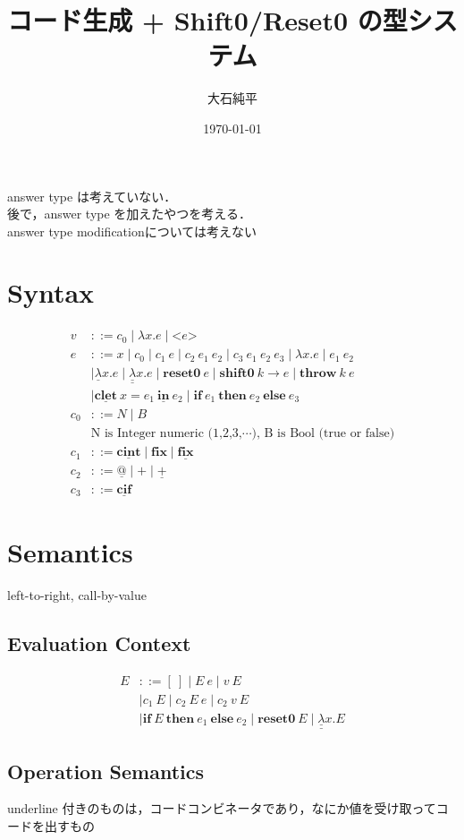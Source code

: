 \documentclass[10pt,a4j]{jarticle}
\title{コード生成 + Shift0/Reset0 の型システム}
\date{\today}
\author{大石純平}
\makeatletter
\newcommand\fun[2]{\lambda{#1}.{#2}}
\newcommand\Resetz{\textbf{reset0}}
\newcommand\Shiftz{\textbf{shift0}}
\newcommand\Throw{\textbf{throw}}
\newcommand\resetz[1]{\Resetz~{#1}}
\newcommand\shiftz[2]{\Shiftz~{#1}\to{#2}}
\newcommand\throw[2]{\Throw~{#1}~{#2}}
\newcommand\cfun[2]{\underline{\lambda}{#1}.{#2}}
\newcommand\ccfun[2]{\underline{\underline{\lambda}}{#1}.{#2}}
\newcommand\cPlus{\underline{\textbf{+}}}
\newcommand\cLet{\underline{\textbf{clet}}}
\newcommand\cIn{\underline{\textbf{in}}}
\newcommand\clet[3]{\cLet~{#1}={#2}~\cIn~{#3}}
\newcommand\cint{\underline{\textbf{cint}}}
\newcommand\code[1]{\texttt{<}{#1}\texttt{>}}
\newcommand\ift[3]{\textbf{if}~{#1}~\textbf{then}~{#2}~\textbf{else}~{#3}}
\newcommand\cIf{\underline{\textbf{cif}}}
\newcommand\fix{\textbf{fix}}
\newcommand\cfix{\underline{\textbf{fix}}}
\newcommand\cat{\underline{@}}
\theoremstyle{break}
\makeatother
\begin{document}
\maketitle

answer type は考えていない．\\
後で，answer type を加えたやつを考える．\\
answer type modificationについては考えない

\section{Syntax}
\begin{align*}
  v & ::= c_0 \mid \fun{x}{e} \mid \code{e} \\
  e & ::=  x \mid c_0 \mid c_1~ e \mid c_2~ e_1~ e_2 \mid c_3~ e_1~ e_2~ e_3 \mid \fun{x}{e} \mid e_1~ e_2 \\
    & \mid \cfun{x}{e}
      \mid \ccfun{x}{e}
      \mid \resetz{e}
      \mid \shiftz{k}{e}
      \mid \throw{k}{e} \\
    & \mid \clet{x}{e_1}{e_2}
      \mid \ift{e_1}{e_2}{e_3} \\
  c_0 & ::= N \mid B \\
  & \text{N is Integer numeric (1,2,3,$\cdots$), B is Bool (true or false)}\\
  c_1 & ::= \cint \mid \fix \mid \cfix \\
  c_2 & ::= \cat \mid + \mid \cPlus \\
  c_3 & ::= \cIf
\end{align*}


\section{Semantics}
left-to-right, call-by-value

\subsection{Evaluation Context}

\begin{align*}
  E & ::= [~] \mid E~ e \mid v~ E \\
    & \mid c_1~ E \mid c_2~ E~ e \mid c_2~ v~ E \\
    & \mid \ift{E}{e_1}{e_2} \mid \Resetz~ E \mid \ccfun{x}{E}
\end{align*}

\subsection{Operation Semantics}
underline 付きのものは，コードコンビネータであり，なにか値を受け取ってコードを出すもの
\end{document}
